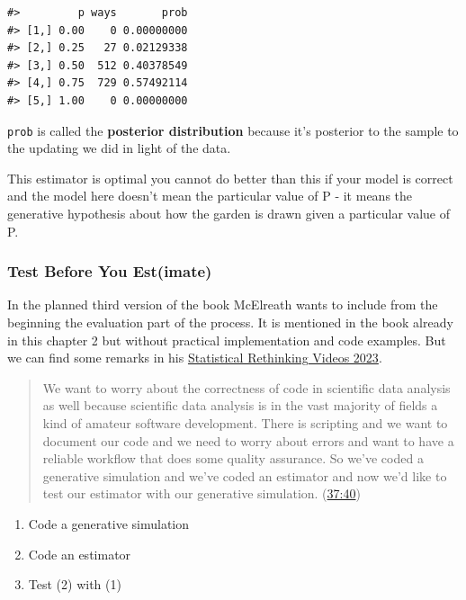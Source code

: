\documentclass[
  letterpaper,
  DIV=11,
  numbers=noendperiod]{scrreprt}
\providecommand{\tightlist}{%
  \setlength{\itemsep}{0pt}\setlength{\parskip}{0pt}}\usepackage{longtable,booktabs,array}
\begin{document}
\begin{verbatim}
#>         p ways       prob
#> [1,] 0.00    0 0.00000000
#> [2,] 0.25   27 0.02129338
#> [3,] 0.50  512 0.40378549
#> [4,] 0.75  729 0.57492114
#> [5,] 1.00    0 0.00000000
\end{verbatim}

\texttt{prob} is called the \textbf{posterior distribution} because it's
posterior to the sample to the updating we did in light of the data.

This estimator is optimal you cannot do better than this if your model
is correct and the model here doesn't mean the particular value of P -
it means the generative hypothesis about how the garden is drawn given a
particular value of P.

\hypertarget{test-before-you-estimate}{%
\subsubsection{Test Before You
Est(imate)}\label{test-before-you-estimate}}

In the planned third version of the book McElreath wants to include from
the beginning the evaluation part of the process. It is mentioned in the
book already in this chapter 2 but without practical implementation and
code examples. But we can find some remarks in his
\href{https://www.youtube.com/playlist?list=PLDcUM9US4XdPz-KxHM4XHt7uUVGWWVSus}{Statistical
Rethinking Videos 2023}.

\begin{quote}
We want to worry about the correctness of code in scientific data
analysis as well because scientific data analysis is in the vast
majority of fields a kind of amateur software development. There is
scripting and we want to document our code and we need to worry about
errors and want to have a reliable workflow that does some quality
assurance. So we've coded a generative simulation and we've coded an
estimator and now we'd like to test our estimator with our generative
simulation.
(\href{https://www.youtube.com/watch?v=R1vcdhPBlXA&list=PLDcUM9US4XdPz-KxHM4XHt7uUVGWWVSus&index=2&t=37m40s}{37:40})
\end{quote}

\begin{enumerate}
\def\labelenumi{\arabic{enumi}.}
\tightlist
\item
  Code a generative simulation
\item
  Code an estimator
\item
  Test (2) with (1)
\end{enumerate}
\end{document}
